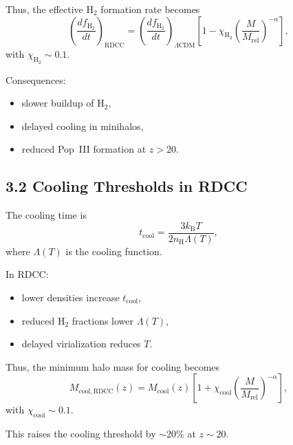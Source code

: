 \documentclass[11pt,a4paper]{article}
\begin{document}
Thus, the effective $\mathrm{H}_2$ formation rate becomes
\begin{equation}
    \left(\frac{df_{\mathrm{H_2}}}{dt}\right)_{\mathrm{RDCC}}
    = \left(\frac{df_{\mathrm{H_2}}}{dt}\right)_{\Lambda\mathrm{CDM}}
      \left[
        1 - \chi_{\mathrm{H_2}}
        \left(\frac{M}{M_{\mathrm{rel}}}\right)^{-\alpha}
      \right],
\end{equation}
with $\chi_{\mathrm{H_2}} \sim 0.1$.

Consequences:

\begin{itemize}
    \item slower buildup of $\mathrm{H}_2$,
    \item delayed cooling in minihalos,
    \item reduced Pop~III formation at $z > 20$.
\end{itemize}

\subsection*{3.2 Cooling Thresholds in RDCC}

The cooling time is
\begin{equation}
    t_{\mathrm{cool}}
    = \frac{3 k_{\mathrm{B}} T}{2 n_{\mathrm{H}} \Lambda(T)},
\end{equation}
where $\Lambda(T)$ is the cooling function.

In RDCC:

\begin{itemize}
    \item lower densities increase $t_{\mathrm{cool}}$,
    \item reduced $\mathrm{H}_2$ fractions lower $\Lambda(T)$,
    \item delayed virialization reduces $T$.
\end{itemize}

Thus, the minimum halo mass for cooling becomes
\begin{equation}
    M_{\mathrm{cool,RDCC}}(z)
    = M_{\mathrm{cool}}(z)
      \left[
        1 + \chi_{\mathrm{cool}}
        \left(\frac{M}{M_{\mathrm{rel}}}\right)^{-\alpha}
      \right],
\end{equation}
with $\chi_{\mathrm{cool}} \sim 0.1$.

This raises the cooling threshold by $\sim 20\%$ at $z \sim 20$.

\end{document}
